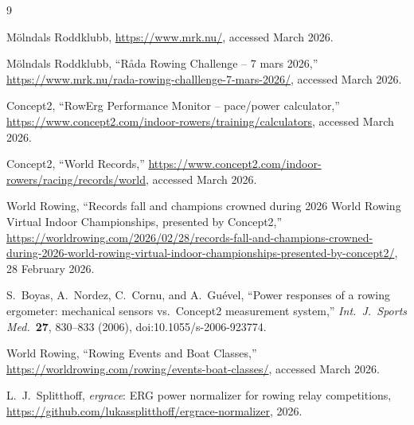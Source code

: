 \documentclass[twocolumn, 10pt]{article}
\begin{document}
\begin{thebibliography}{9}

  M{\"o}lndals Roddklubb, \url{https://www.mrk.nu/}, accessed March 2026.

  M{\"o}lndals Roddklubb, ``R{\aa}da Rowing Challenge -- 7 mars 2026,''
  \url{https://www.mrk.nu/rada-rowing-challlenge-7-mars-2026/},
  accessed March 2026.

  Concept2, ``RowErg Performance Monitor -- pace/power calculator,''
  \url{https://www.concept2.com/indoor-rowers/training/calculators},
  accessed March 2026.

  Concept2, ``World Records,''
  \url{https://www.concept2.com/indoor-rowers/racing/records/world},
  accessed March 2026.

  World Rowing, ``Records fall and champions crowned during 2026 World Rowing
  Virtual Indoor Championships, presented by Concept2,''
  \url{https://worldrowing.com/2026/02/28/records-fall-and-champions-crowned-during-2026-world-rowing-virtual-indoor-championships-presented-by-concept2/},
  28 February 2026.

  S.\ Boyas, A.\ Nordez, C.\ Cornu, and A.\ Gu{\'e}vel,
  ``Power responses of a rowing ergometer: mechanical sensors vs.\
  Concept2\textregistered{} measurement system,''
  \textit{Int.\ J.\ Sports Med.}\ \textbf{27}, 830--833 (2006),
  doi:10.1055/s-2006-923774.

  World Rowing, ``Rowing Events and Boat Classes,''
  \url{https://worldrowing.com/rowing/events-boat-classes/},
  accessed March 2026.

  L.\ J.\ Splitthoff, \textit{ergrace}: ERG power normalizer for rowing relay
  competitions, \url{https://github.com/lukassplitthoff/ergrace-normalizer}, 2026.

\end{thebibliography}
\end{document}

